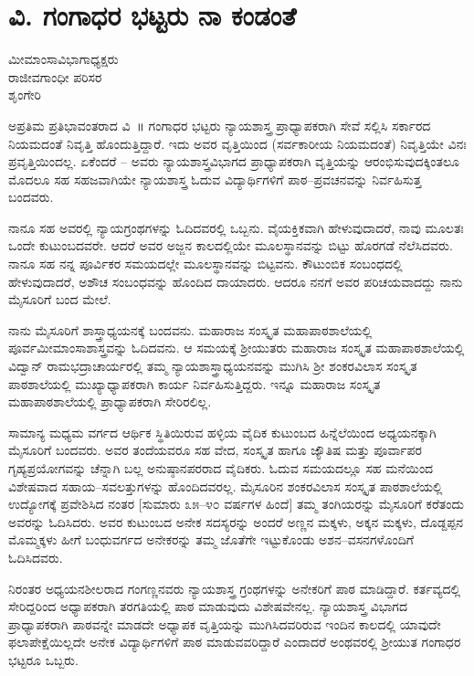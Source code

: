 \chapter{ವಿ. ಗಂಗಾಧರ ಭಟ್ಟರು ನಾ ಕಂಡಂತೆ}

\begin{center}
\smallskip

ಮೀಮಾಂಸಾವಿಭಾಗಾಧ್ಯಕ್ಷರು\\   
ರಾಜೀವಗಾಂಧೀ ಪರಿಸರ\\
ಶೃಂಗೇರಿ
\addrule	
\end{center}

ಅಪ್ರತಿಮ ಪ್ರತಿಭಾವಂತರಾದ ವಿ~॥ ಗಂಗಾಧರ ಭಟ್ಟರು ನ್ಯಾಯಶಾಸ್ತ್ರ ಪ್ರಾಧ್ಯಾಪಕರಾಗಿ ಸೇವೆ ಸಲ್ಲಿಸಿ ಸರ್ಕಾರದ ನಿಯಮದಂತೆ ನಿವೃತ್ತಿ ಹೊಂದುತ್ತಿದ್ದಾರೆ. ಇದು ಅವರ ವೃತ್ತಿಯಿಂದ (ಸರ್ವಕಾರೀಯ ನಿಯಮದಂತೆ) ನಿವೃತ್ತಿಯೇ ವಿನಃ ಪ್ರವೃತ್ತಿಯಿಂದಲ್ಲ. ಏಕೆಂದರೆ – ಅವರು ನ್ಯಾಯಶಾಸ್ತ್ರವಿಭಾಗದ ಪ್ರಾಧ್ಯಾಪಕರಾಗಿ ವೃತ್ತಿಯನ್ನು ಆರಂಭಿಸುವುದಕ್ಕಿಂತಲೂ ಮೊದಲೂ ಸಹ ಸಹಜವಾಗಿಯೇ ನ್ಯಾಯಶಾಸ್ತ್ರ ಓದುವ ವಿದ್ಯಾರ್ಥಿಗಳಿಗೆ ಪಾಠ–ಪ್ರವಚನವನ್ನು ನಿರ್ವಹಿಸುತ್ತ ಬಂದವರು.

ನಾನೂ ಸಹ ಅವರಲ್ಲಿ ನ್ಯಾಯಗ್ರಂಥಗಳನ್ನು ಓದಿದವರಲ್ಲಿ ಒಬ್ಬನು. ವೈಯಕ್ತಿಕವಾಗಿ ಹೇಳುವುದಾದರೆ, ನಾವು ಮೂಲತಃ ಒಂದೇ ಕುಟುಂಬದವರೇ. ಆದರೆ ಅವರ ಅಜ್ಜನ ಕಾಲದಲ್ಲಿಯೇ ಮೂಲಸ್ಥಾನವನ್ನು ಬಿಟ್ಟು ಹೊರಗಡೆ ನೆಲೆಸಿದವರು. ನಾನೂ ಸಹ ನನ್ನ ಪೂರ್ವಿಕರ ಸಮಯದಲ್ಲೇ ಮೂಲಸ್ಥಾನವನ್ನು ಬಿಟ್ಟವನು. ಕೌಟುಂಬಿಕ ಸಂಬಂಧದಲ್ಲಿ ಹೇಳುವುದಾದರೆ, ಅಶೌಚ ಸಂಬಂಧವನ್ನು ಹೊಂದಿದ ದಾಯಾದರು. ಆದರೂ ನನಗೆ ಅವರ ಪರಿಚಯವಾದದ್ದು ನಾನು ಮೈಸೂರಿಗೆ ಬಂದ ಮೇಲೆ.

ನಾನು ಮೈಸೂರಿಗೆ ಶಾಸ್ತ್ರಾಧ್ಯಯನಕ್ಕೆ ಬಂದವನು. ಮಹಾರಾಜ ಸಂಸ್ಕೃತ ಮಹಾಪಾಠಶಾಲೆಯಲ್ಲಿ ಪೂರ್ವಮೀಮಾಂಸಾಶಾಸ್ತ್ರವನ್ನು ಓದಿದವನು. ಆ ಸಮಯಕ್ಕೆ ಶ್ರೀಯುತರು ಮಹಾರಾಜ ಸಂಸ್ಕೃತ ಮಹಾಪಾಠಶಾಲೆಯಲ್ಲಿ ವಿದ್ವಾನ್ ರಾಮಭದ್ರಾಚಾರ್ಯರಲ್ಲಿ ತಮ್ಮ ನ್ಯಾಯಶಾಸ್ತ್ರಾಧ್ಯಯನವನ್ನು ಮುಗಿಸಿ ಶ್ರೀ ಶಂಕರವಿಲಾಸ ಸಂಸ್ಕೃತ ಪಾಠಶಾಲೆಯಲ್ಲಿ ಮುಖ್ಯಾಧ್ಯಾಪಕರಾಗಿ ಕಾರ್ಯ ನಿರ್ವಹಿಸುತ್ತಿದ್ದರು. ಇನ್ನೂ ಮಹಾರಾಜ ಸಂಸ್ಕೃತ ಮಹಾಪಾಠಶಾಲೆಯಲ್ಲಿ ಪ್ರಾಧ್ಯಾಪಕರಾಗಿ ಸೇರಿರಲಿಲ್ಲ.

ಸಾಮಾನ್ಯ ಮಧ್ಯಮ ವರ್ಗದ ಆರ್ಥಿಕ ಸ್ಥಿತಿಯಿರುವ ಹಳ್ಳಿಯ ವೈದಿಕ ಕುಟುಂಬದ ಹಿನ್ನೆಲೆಯಿಂದ ಅಧ್ಯಯನಕ್ಕಾಗಿ ಮೈಸೂರಿಗೆ ಬಂದವರು. ಅವರ ತಂದೆಯವರೂ ಸಹ ವೇದ, ಸಂಸ್ಕೃತ ಹಾಗೂ ಜ್ಯೌತಿಷ ಮತ್ತು ಪೂರ್ವಾಪರ ಗೃಹ್ಯಪ್ರಯೋಗವನ್ನು ಚೆನ್ನಾಗಿ ಬಲ್ಲ ಅನುಷ್ಠಾನಪರರಾದ ವೈದಿಕರು. ಓದುವ ಸಮಯದಲ್ಲೂ ಸಹ ಮನೆಯಿಂದ ವಿಶೇಷವಾದ ಸಹಾಯ–ಸವಲತ್ತುಗಳನ್ನು ಹೊಂದಿದವರಲ್ಲ. ಮೈಸೂರಿನ ಶಂಕರವಿಲಾಸ ಸಂಸ್ಕೃತ ಪಾಠಶಾಲೆಯಲ್ಲಿ ಉದ್ಯೋಗಕ್ಕೆ ಪ್ರವೇಶಿಸಿದ ನಂತರ [ಸುಮಾರು ೩೫–೪೦ ವರ್ಷಗಳ ಹಿಂದೆ] ತಮ್ಮ ತಂಗಿಯರನ್ನು ಮೈಸೂರಿಗೆ ಕರೆತಂದು ಅವರನ್ನು ಓದಿಸಿದರು. ಅವರ ಕುಟುಂಬದ ಅನೇಕ ಸದಸ್ಯರನ್ನು ಅಂದರೆ ಅಣ್ಣನ ಮಕ್ಕಳು, ಅಕ್ಕನ ಮಕ್ಕಳು, ದೊಡ್ದಪ್ಪನ ಮೊಮ್ಮಕ್ಕಳು ಹೀಗೆ ಬಂಧುವರ್ಗದ ಅನೇಕರನ್ನು ತಮ್ಮ ಜೊತೆಗೇ ಇಟ್ಟುಕೊಂಡು ಅಶನ–ವಸನಗಳೊಂದಿಗೆ ಓದಿಸಿದವರು.

ನಿರಂತರ ಅಧ್ಯಯನಶೀಲರಾದ ಗಂಗಣ್ಣನವರು ನ್ಯಾಯಶಾಸ್ತ್ರ ಗ್ರಂಥಗಳನ್ನು ಅನೇಕರಿಗೆ ಪಾಠ ಮಾಡಿದ್ದಾರೆ. ಕರ್ತವ್ಯದಲ್ಲಿ ಸೇರಿದ್ದರಿಂದ ಅಧ್ಯಾಪಕರಾಗಿ ತರಗತಿಯಲ್ಲಿ ಪಾಠ ಮಾಡುವುದು ವಿಶೇಷವೇನಲ್ಲ. ನ್ಯಾಯಶಾಸ್ತ್ರ ವಿಭಾಗದ ಪ್ರಾಧ್ಯಾಪಕರಾಗಿ ಪಾಠವನ್ನೇ ಮಾಡದೇ ಅಧ್ಯಾಪಕ ವೃತ್ತಿಯನ್ನು ಮುಗಿಸಿದವರಿರುವ ಇಂದಿನ ಕಾಲದಲ್ಲಿ ಯಾವುದೇ ಫಲಾಪೇಕ್ಷೆಯಿಲ್ಲದೇ ಅನೇಕ ವಿದ್ಯಾರ್ಥಿಗಳಿಗೆ ಪಾಠ ಮಾಡುವವರಿದ್ದಾರೆ ಎಂದಾದರೆ ಅಂಥವರಲ್ಲಿ ಶ್ರೀಯುತ ಗಂಗಾಧರ ಭಟ್ಟರೂ ಒಬ್ಬರು.

